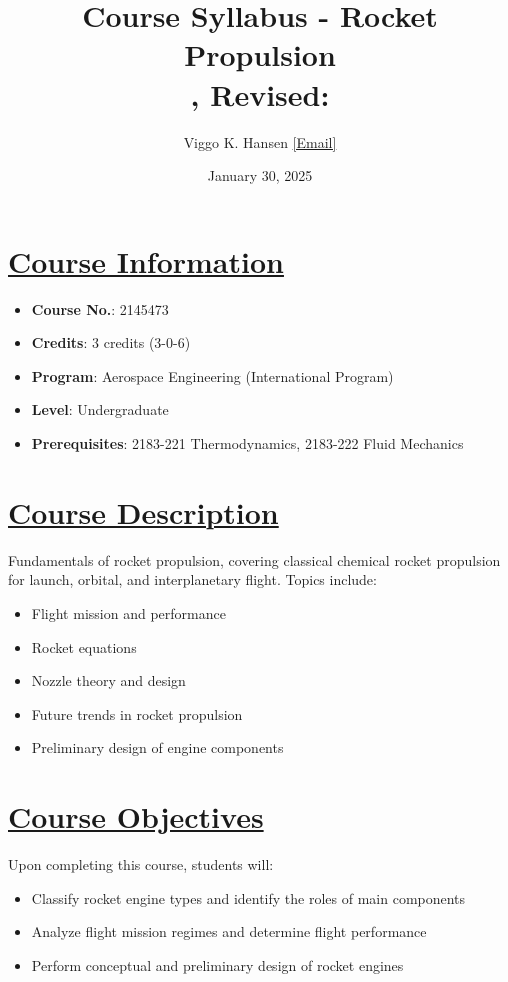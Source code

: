 \documentclass[12pt]{article}
\title{\textbf{Course Syllabus - Rocket Propulsion} \\ \small{\documentversion, Revised: \documentdate}}
\author{Viggo K. Hansen \href{mailto:vkhansen@eng.chula.ac.th}{[Email]}}
\date{January 30, 2025}
\newcommand{\documentversion}{Version 1.0}
\newcommand{\documentdate}{\today}
\begin{document}
\maketitle

\pagestyle{fancy}
\fancyhf{}
\fancyhead[L]{\documentversion}
\fancyhead[R]{\documentdate}
\renewcommand{\headrulewidth}{0.4pt}
\renewcommand{\footrulewidth}{0.4pt}

\tableofcontents

\section{\hyperref[sec:course_info]{Course Information}}
\label{sec:course_info}
\begin{itemize}
    \item \textbf{Course No.}: 2145473
    \item \textbf{Credits}: 3 credits (3-0-6)
    \item \textbf{Program}: Aerospace Engineering (International Program)
    \item \textbf{Level}: Undergraduate
    \item \textbf{Prerequisites}: 2183-221 Thermodynamics, 2183-222 Fluid Mechanics
\end{itemize}

\section{\hyperref[sec:course_desc]{Course Description}}
\label{sec:course_desc}
Fundamentals of rocket propulsion, covering classical chemical rocket propulsion for launch, orbital, and interplanetary flight. Topics include:
\begin{itemize}
    \item Flight mission and performance
    \item Rocket equations
    \item Nozzle theory and design
    \item Future trends in rocket propulsion
    \item Preliminary design of engine components
\end{itemize}

\section{\hyperref[sec:objectives]{Course Objectives}}
\label{sec:objectives}
Upon completing this course, students will:
\begin{itemize}
    \item Classify rocket engine types and identify the roles of main components
    \item Analyze flight mission regimes and determine flight performance
    \item Perform conceptual and preliminary design of rocket engines
\end{itemize}
\end{document}
